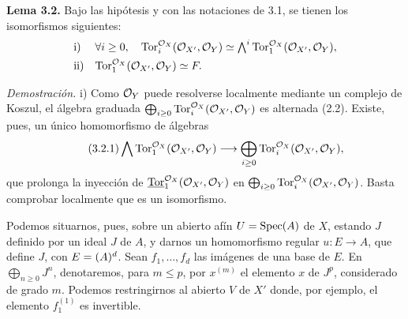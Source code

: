 \textbf{Lema 3.2.} Bajo las hipótesis y con las notaciones de 3.1, se tienen los isomorfismos siguientes:
\[
\begin{array}{ll}
\text{i)}&
\forall i\ge0,\quad
\Tor_i^{\cO_X}(\cO_{X'},\cO_Y)
\simeq
\bigwedge^i\Tor_1^{\cO_X}(\cO_{X'},\cO_Y),\\[4pt]
\text{ii)}&
\Tor_1^{\cO_X}(\cO_{X'},\cO_Y)\simeq F.
\end{array}
\]

\textit{Demostración.}
i) Como \(\cO_Y\) puede resolverse localmente mediante un complejo de Koszul, el álgebra graduada \(\bigoplus_{i\ge0}\Tor_i^{\cO_X}(\cO_{X'},\cO_Y)\) es alternada (2.2). Existe, pues, un único homomorfismo de álgebras
\begin{equation}\tag{3.2.1}
\bigwedge \Tor_1^{\cO_X}(\cO_{X'},\cO_Y)
\longrightarrow
\bigoplus_{i\ge0}\Tor_i^{\cO_X}(\cO_{X'},\cO_Y),
\end{equation}
que prolonga la inyección de \(\underline{\Tor}_1^{\cO_X}(\cO_{X'},\cO_Y)\) en
\(\bigoplus_{i\ge0}\Tor_i^{\cO_X}(\cO_{X'},\cO_Y)\). Basta comprobar localmente que es un isomorfismo.

Podemos situarnos, pues, sobre un abierto afín \(U=\Spec(A)\) de \(X\), estando \(J\) definido por un ideal \(J\) de \(A\), y darnos un homomorfismo regular \(u:E\to A\), que define \(J\), con \(E=(A)^{\sisi{n}{d}}\). Sean \(f_1,\ldots,f_d\) las imágenes de una base de \(E\). En \(\bigoplus_{n\ge0}J^n\), denotaremos, para \(m\le p\), por \(x^{(m)}\) el elemento \(x\) de \(J^p\), considerado de grado \(m\). Podemos restringirnos al abierto \(V\) de \(X'\) donde, por ejemplo, el elemento \(f_1^{(1)}\) es invertible.

